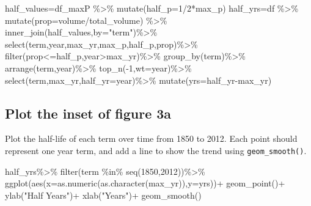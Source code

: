 \documentclass[
]{article}
\newenvironment{Shaded}{\begin{snugshade}}{\end{snugshade}}
\newcommand{\AttributeTok}[1]{\textcolor[rgb]{0.77,0.63,0.00}{#1}}
\newcommand{\DecValTok}[1]{\textcolor[rgb]{0.00,0.00,0.81}{#1}}
\newcommand{\FunctionTok}[1]{\textcolor[rgb]{0.00,0.00,0.00}{#1}}
\newcommand{\NormalTok}[1]{#1}
\newcommand{\OtherTok}[1]{\textcolor[rgb]{0.56,0.35,0.01}{#1}}
\newcommand{\SpecialCharTok}[1]{\textcolor[rgb]{0.00,0.00,0.00}{#1}}
\newcommand{\StringTok}[1]{\textcolor[rgb]{0.31,0.60,0.02}{#1}}
\begin{document}
\begin{Shaded}
\begin{Highlighting}[]
\NormalTok{half\_values}\OtherTok{=}\NormalTok{df\_maxP }\SpecialCharTok{\%\textgreater{}\%}  \FunctionTok{mutate}\NormalTok{(}\AttributeTok{half\_p=}\DecValTok{1}\SpecialCharTok{/}\DecValTok{2}\SpecialCharTok{*}\NormalTok{max\_p) }
\NormalTok{half\_yrs}\OtherTok{=}\NormalTok{df }\SpecialCharTok{\%\textgreater{}\%} \FunctionTok{mutate}\NormalTok{(}\AttributeTok{prop=}\NormalTok{volume}\SpecialCharTok{/}\NormalTok{total\_volume) }\SpecialCharTok{\%\textgreater{}\%}
  \FunctionTok{inner\_join}\NormalTok{(half\_values,}\AttributeTok{by=}\StringTok{"term"}\NormalTok{)}\SpecialCharTok{\%\textgreater{}\%}
  \FunctionTok{select}\NormalTok{(term,year,max\_yr,max\_p,half\_p,prop)}\SpecialCharTok{\%\textgreater{}\%}
  \FunctionTok{filter}\NormalTok{(prop}\SpecialCharTok{\textless{}=}\NormalTok{half\_p,year}\SpecialCharTok{\textgreater{}}\NormalTok{max\_yr)}\SpecialCharTok{\%\textgreater{}\%}
  \FunctionTok{group\_by}\NormalTok{(term)}\SpecialCharTok{\%\textgreater{}\%}
  \FunctionTok{arrange}\NormalTok{(term,year)}\SpecialCharTok{\%\textgreater{}\%}
  \FunctionTok{top\_n}\NormalTok{(}\SpecialCharTok{{-}}\DecValTok{1}\NormalTok{,}\AttributeTok{wt=}\NormalTok{year)}\SpecialCharTok{\%\textgreater{}\%}
  \FunctionTok{select}\NormalTok{(term,max\_yr,}\AttributeTok{half\_yr=}\NormalTok{year)}\SpecialCharTok{\%\textgreater{}\%}
  \FunctionTok{mutate}\NormalTok{(}\AttributeTok{yrs=}\NormalTok{half\_yr}\SpecialCharTok{{-}}\NormalTok{max\_yr)}
\end{Highlighting}
\end{Shaded}

\hypertarget{plot-the-inset-of-figure-3a}{%
\subsection{Plot the inset of figure
3a}\label{plot-the-inset-of-figure-3a}}

Plot the half-life of each term over time from 1850 to 2012. Each point
should represent one year term, and add a line to show the trend using
\texttt{geom\_smooth()}.

\begin{Shaded}
\begin{Highlighting}[]
\NormalTok{half\_yrs}\SpecialCharTok{\%\textgreater{}\%}
  \FunctionTok{filter}\NormalTok{(term }\SpecialCharTok{\%in\%} \FunctionTok{seq}\NormalTok{(}\DecValTok{1850}\NormalTok{,}\DecValTok{2012}\NormalTok{))}\SpecialCharTok{\%\textgreater{}\%}
  \FunctionTok{ggplot}\NormalTok{(}\FunctionTok{aes}\NormalTok{(}\AttributeTok{x=}\FunctionTok{as.numeric}\NormalTok{(}\FunctionTok{as.character}\NormalTok{(max\_yr)),}\AttributeTok{y=}\NormalTok{yrs))}\SpecialCharTok{+}
  \FunctionTok{geom\_point}\NormalTok{()}\SpecialCharTok{+}
  \FunctionTok{ylab}\NormalTok{(}\StringTok{"Half Years"}\NormalTok{)}\SpecialCharTok{+}
  \FunctionTok{xlab}\NormalTok{(}\StringTok{"Years"}\NormalTok{)}\SpecialCharTok{+}
  \FunctionTok{geom\_smooth}\NormalTok{()}
\end{Highlighting}
\end{Shaded}
\end{document}
